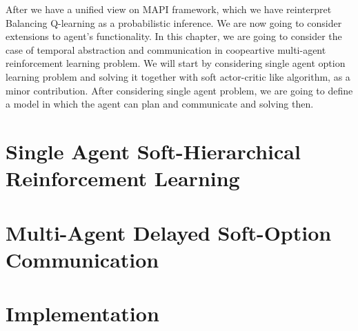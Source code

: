\label{chapter:chap6}
\begin{miniabstract}
After we have a unified view on MAPI framework, which we have reinterpret Balancing Q-learning \cite{grau2018balancing} as a probabilistic inference. We are now going to consider extensions to agent's functionality. In this chapter, we are going to consider the case of temporal abstraction and communication in coopeartive multi-agent reinforcement learning problem. We will start by considering single agent option learning problem and solving it together with soft actor-critic like algorithm, as a minor contribution. After considering single agent problem, we are going to define a model in which the agent can plan and communicate and solving then.
\end{miniabstract}


\section{Single Agent Soft-Hierarchical Reinforcement Learning}


\section{Multi-Agent Delayed Soft-Option Communication}


\section{Implementation}



